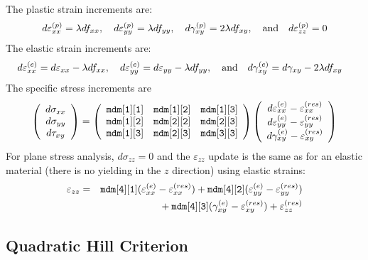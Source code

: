 \documentclass[11pt]{article}
\def\code#1{{\small\tt #1}}
\def\e#1{\varepsilon_{#1}}
\def\er#1{\varepsilon_{#1}^{(res)}}
\def\g#1{\gamma_{#1}}
\def\s#1{\sigma_{#1}}
\def\t#1{\tau_{#1}}
\def\vvec#1#2#3{\left(\begin{array}{ccc} #1 \\ #2 \\ #3 \end{array}\right)}
\begin{document}
The plastic strain increments are:
\begin{equation}
       d\varepsilon_{xx}^{(p)} = \lambda df_{xx}, \quad
       d\varepsilon_{yy}^{(p)} = \lambda df_{yy}, \quad
       d\gamma_{xy}^{(p)} = 2 \lambda df_{xy}, \quad  {\rm and} \quad
       d\varepsilon_{zz}^{(p)} = 0
\end{equation}
The elastic strain increments are:
\begin{equation}
       d\varepsilon_{xx}^{(e)} = d\varepsilon_{xx} -\lambda df_{xx}, \quad
       d\varepsilon_{yy}^{(e)} = d\varepsilon_{yy} -\lambda df_{yy}, \quad   {\rm and} \quad
       d\gamma_{xy}^{(e)} = d\gamma_{xy} - 2 \lambda df_{xy} \quad
\end{equation}
The specific stress increments are
\begin{equation}
      \vvec{d\s{xx}}{d\s{yy}}{d\t{xy}} = \left(\begin{array}{ccc}
      		\code{mdm[1][1]} & \code{mdm[1][2]} & \code{mdm[1][3]}  \\
      		\code{mdm[1][2]} & \code{mdm[2][2]} & \code{mdm[2][3]}  \\
      		\code{mdm[1][3]} & \code{mdm[2][3]} & \code{mdm[3][3]} 
           \end{array}\right)
             \vvec{d\varepsilon_{xx}^{(e)}  - \er{xx}}{d\varepsilon_{yy}^{(e)}  -\er{yy}}{d\g{xy}^{(e)}-\er{xy}}
 \end{equation}
For plane stress analysis, $d\sigma_{zz}=0$ and the $\varepsilon_{zz}$ update is the same as for an elastic material (there is no yielding in the $z$ direction) using elastic strains:
\begin{eqnarray}
     \e{zz} & = & \code{mdm[4][1]} (\e{xx}^{(e)} - \er{xx}) +  \code{mdm[4][2]}(\e{yy}^{(e)} -\er{yy}) 
     \nonumber \\
     && \qquad\qquad\mbox{}
                 + \code{mdm[4][3]}(\g{xy}^{(e)}-\er{xy})  + \er{zz}
\end{eqnarray}

\subsection{Quadratic Hill Criterion}
\end{document}
